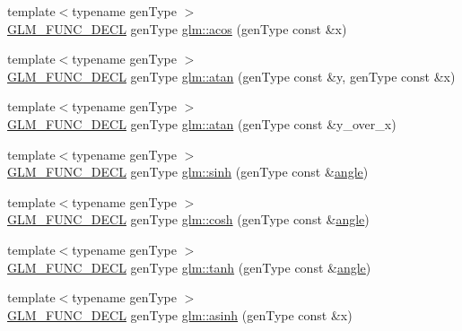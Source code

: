 \begin{DoxyCompactItemize}
\item 
{\footnotesize template$<$typename gen\+Type $>$ }\\\hyperlink{setup_8hpp_ab2d052de21a70539923e9bcbf6e83a51}{G\+L\+M\+\_\+\+F\+U\+N\+C\+\_\+\+D\+E\+CL} gen\+Type \hyperlink{group__core__func__trigonometric_gac85497ed2e39d4cac4ac32bed4dfc506}{glm\+::acos} (gen\+Type const \&x)
\item 
{\footnotesize template$<$typename gen\+Type $>$ }\\\hyperlink{setup_8hpp_ab2d052de21a70539923e9bcbf6e83a51}{G\+L\+M\+\_\+\+F\+U\+N\+C\+\_\+\+D\+E\+CL} gen\+Type \hyperlink{group__core__func__trigonometric_gabf80ac0817d1db032dd6a0969aa2b84a}{glm\+::atan} (gen\+Type const \&y, gen\+Type const \&x)
\item 
{\footnotesize template$<$typename gen\+Type $>$ }\\\hyperlink{setup_8hpp_ab2d052de21a70539923e9bcbf6e83a51}{G\+L\+M\+\_\+\+F\+U\+N\+C\+\_\+\+D\+E\+CL} gen\+Type \hyperlink{group__core__func__trigonometric_gaa7be96f0c12a40eeac5c7f04a3d465a1}{glm\+::atan} (gen\+Type const \&y\+\_\+over\+\_\+x)
\item 
{\footnotesize template$<$typename gen\+Type $>$ }\\\hyperlink{setup_8hpp_ab2d052de21a70539923e9bcbf6e83a51}{G\+L\+M\+\_\+\+F\+U\+N\+C\+\_\+\+D\+E\+CL} gen\+Type \hyperlink{group__core__func__trigonometric_ga2e8c9a896e803661058de83429aa6eda}{glm\+::sinh} (gen\+Type const \&\hyperlink{group__gtc__quaternion_ga23a3fc7ada5bbb665ff84c92c6e0542c}{angle})
\item 
{\footnotesize template$<$typename gen\+Type $>$ }\\\hyperlink{setup_8hpp_ab2d052de21a70539923e9bcbf6e83a51}{G\+L\+M\+\_\+\+F\+U\+N\+C\+\_\+\+D\+E\+CL} gen\+Type \hyperlink{group__core__func__trigonometric_gaa7685634f6e920ba9a683e5ec7aed976}{glm\+::cosh} (gen\+Type const \&\hyperlink{group__gtc__quaternion_ga23a3fc7ada5bbb665ff84c92c6e0542c}{angle})
\item 
{\footnotesize template$<$typename gen\+Type $>$ }\\\hyperlink{setup_8hpp_ab2d052de21a70539923e9bcbf6e83a51}{G\+L\+M\+\_\+\+F\+U\+N\+C\+\_\+\+D\+E\+CL} gen\+Type \hyperlink{group__core__func__trigonometric_ga941f20e5315113d1a2e037f073a62f04}{glm\+::tanh} (gen\+Type const \&\hyperlink{group__gtc__quaternion_ga23a3fc7ada5bbb665ff84c92c6e0542c}{angle})
\item 
{\footnotesize template$<$typename gen\+Type $>$ }\\\hyperlink{setup_8hpp_ab2d052de21a70539923e9bcbf6e83a51}{G\+L\+M\+\_\+\+F\+U\+N\+C\+\_\+\+D\+E\+CL} gen\+Type \hyperlink{group__core__func__trigonometric_gaa52acc1218a5ddd0f8d94fcd098685b1}{glm\+::asinh} (gen\+Type const \&x)

\end{DoxyCompactItemize}
